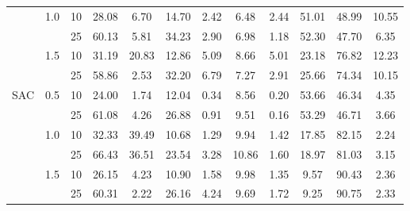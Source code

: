 \documentclass[manuscript,screen,review]{acmart}
\begin{document}
\begin{table}[ht]
{\begin{tabular}{cccccccccccc}
    & 1.0 & 10 &  28.08 &   6.70 &   14.70 &  2.42 &           6.48 &  2.44 &    51.01 &    48.99 &  10.55 \\
    &     & 25 &  60.13 &   5.81 &   34.23 &  2.90 &           6.98 &  1.18 &    52.30 &    47.70 &   6.35 \\
    & 1.5 & 10 &  31.19 &  20.83 &   12.86 &  5.09 &           8.66 &  5.01 &    23.18 &    76.82 &  12.23 \\
    &     & 25 &  58.86 &   2.53 &   32.20 &  6.79 &           7.27 &  2.91 &    25.66 &    74.34 &  10.15 \\
SAC & 0.5 & 10 &  24.00 &   1.74 &   12.04 &  0.34 &           8.56 &  0.20 &    53.66 &    46.34 &   4.35 \\
    &     & 25 &  61.08 &   4.26 &   26.88 &  0.91 &           9.51 &  0.16 &    53.29 &    46.71 &   3.66 \\
    & 1.0 & 10 &  32.33 &  39.49 &   10.68 &  1.29 &           9.94 &  1.42 &    17.85 &    82.15 &   2.24 \\
    &     & 25 &  66.43 &  36.51 &   23.54 &  3.28 &          10.86 &  1.60 &    18.97 &    81.03 &   3.15 \\
    & 1.5 & 10 &  26.15 &   4.23 &   10.90 &  1.58 &           9.98 &  1.35 &     9.57 &    90.43 &   2.36 \\
    &     & 25 &  60.31 &   2.22 &   26.16 &  4.24 &           9.69 &  1.72 &     9.25 &    90.75 &   2.33 \\
\end{tabular}}
\label{tab:additional}
\end{table}%

\end{document}
